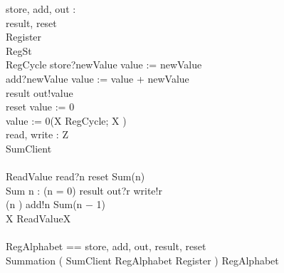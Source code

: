 \documentclass{llncs}
\begin{document}
\begin{circus}

\circchannel store, add, out : \nat\\
\circchannel result, reset\\
\circprocess Register \circdef\\
	\circbegin \circstate RegSt \\
	RegCycle \circdef store?newValue \then value := newValue\\
	\extchoice add?newValue \then value := value + newValue\\
	\extchoice result \then out!value \then \Skip\\
	\extchoice reset \then value := 0\\
	\circspot value := 0\circseq (\circmu X \circspot RegCycle; X )
	\circend\\

\circchannel read, write : Z\\
\circprocess SumClient \circdef\\
	\circbegin\\
	ReadValue \circdef read?n \then reset \then Sum(n)\\
	Sum \circdef n : \nat \circspot (n = 0) \circguard result \then out?r \then write!r \then \Skip\\
	\extchoice (n ) \circguard add!n \then Sum(n − 1)\\
	\circspot \circmu X \circspot ReadValue\circseq X\\
	\circend\\

\circchannelset RegAlphabet == \lchanset store, add, out, result, reset \rchanset\\
\circprocess Summation \circdef ( SumClient \lpar RegAlphabet \rpar Register ) \circhide RegAlphabet
\end{circus}
\end{document}
